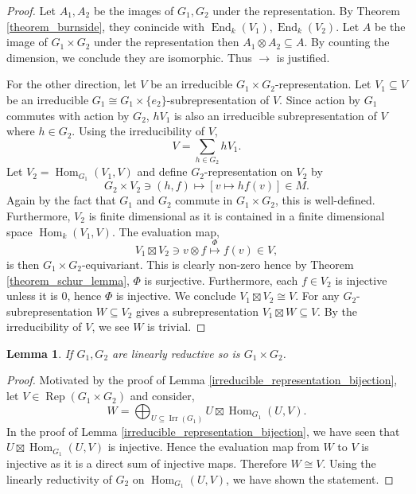 \documentclass[10pt]{article}
\newtheorem{lemma}{Lemma}[section]
\numberwithin{equation}{theorem}
\DeclareMathOperator{\End}{End}
\DeclareMathOperator{\Irr}{Irr}
\DeclareMathOperator{\Rep}{Rep}
\DeclareMathOperator{\Hom}{Hom}
\begin{document}
\begin{proof}
  Let $A_1,A_2$ be the images of $G_1,G_2$ under the representation. By Theorem \ref{theorem_burnside}, they conincide with $\End_k(V_1),\End_k(V_2)$. Let $A$ be the image of $G_1\times G_2$ under the representation then $A_1\otimes A_2\subseteq A$. By counting the dimension, we conclude they are isomorphic. Thus $\rightarrow$ is justified.
  \par For the other direction, let $V$ be an irreducible $G_1\times G_2$-representation. Let $V_1\subseteq V$ be an irreducible $G_1\cong G_1\times\{e_2\}$-subrepresentation of $V$. Since action by $G_1$ commutes with action by $G_2$, $hV_1$ is also an irreducible subrepresentation of $V$ where $h\in G_2$. Using the irreducibility of $V$,
  \begin{equation*}
    V = \sum_{h\in G_2}hV_1.
  \end{equation*}
  Let $V_2=\Hom_{G_1}(V_1,V)$ and define $G_2$-representation on $V_2$ by 
  \begin{equation*}
    G_2\times V_2\ni (h,f)\mapsto [v\mapsto hf(v)]\in M.
  \end{equation*}
  Again by the fact that $G_1$ and $G_2$ commute in $G_1\times G_2$, this is well-defined. Furthermore, $V_2$ is finite dimensional as it is contained in a finite dimensional space $\Hom_k(V_1,V)$.
  The evaluation map,
  \begin{equation*}
    V_1\boxtimes V_2\ni v\otimes f\stackrel{\Phi}{\mapsto} f(v)\in V,
  \end{equation*}
  is then $G_1\times G_2$-equivariant. This is clearly non-zero hence by Theorem \ref{theorem_schur_lemma}, $\Phi$ is surjective. Furthermore, each $f\in V_2$ is injective unless it is $0$, hence $\Phi$ is injective.
  We conclude $V_1\boxtimes V_2\cong V$. For any $G_2$-subrepresentation $W\subseteq V_2$ gives a subrepresentation $V_1\boxtimes W\subseteq V$. By the irreducibility of $V$, we see $W$ is trivial.
\end{proof}
\begin{lemma}
  If $G_1,G_2$ are linearly reductive so is $G_1\times G_2$.
  \label{produc_linearly_reductive}
\end{lemma}
\begin{proof}
  Motivated by the proof of Lemma \ref{irreducible_representation_bijection}, let $V\in\Rep(G_1\times G_2)$ and consider,
  \begin{equation*}
    W=\bigoplus_{U\subseteq \Irr(G_1)}U\boxtimes \Hom_{G_1}(U,V).
  \end{equation*}
  In the proof of Lemma \ref{irreducible_representation_bijection}, we have seen that $U\boxtimes \Hom_{G_1}(U,V)$ is injective. Hence the evaluation map from $W$ to $V$ is injective as it is a direct sum of injective maps.
  Therefore $W\cong V$. Using the linearly reductivity of $G_2$ on $\Hom_{G_1}(U,V)$, we have shown the statement.
\end{proof}
\end{document}
